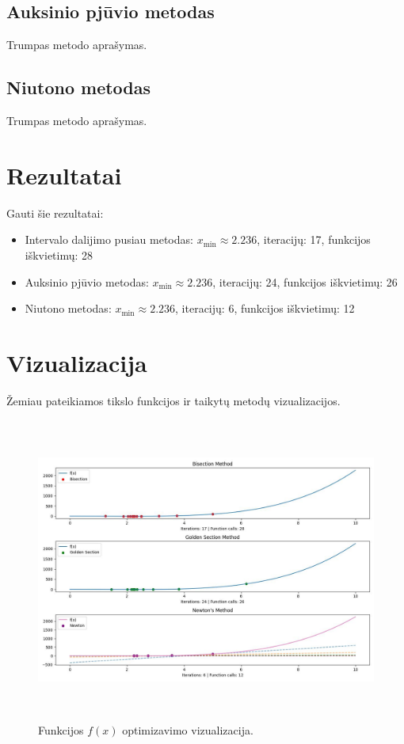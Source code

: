 \documentclass[a4paper,12pt]{article}
\begin{document}
\subsection{Auksinio pjūvio metodas}
Trumpas metodo aprašymas.

\subsection{Niutono metodas}
Trumpas metodo aprašymas.

\section{Rezultatai}
Gauti šie rezultatai:

\begin{itemize}
    \item Intervalo dalijimo pusiau metodas: 
        $x_{\min} \approx 2.236$, iteracijų: 17, funkcijos iškvietimų: 28
    \item Auksinio pjūvio metodas:
        $x_{\min} \approx 2.236$, iteracijų: 24, funkcijos iškvietimų: 26
    \item Niutono metodas:
        $x_{\min} \approx 2.236$, iteracijų: 6, funkcijos iškvietimų: 12
\end{itemize}

\section{Vizualizacija}
Žemiau pateikiamos tikslo funkcijos ir taikytų metodų vizualizacijos.

\begin{figure}[H]
    \centering
    \includegraphics[width=\textwidth,height=10cm]{figure-1.jpeg}
    \caption{\label{fig:all}Funkcijos $f(x)$ optimizavimo vizualizacija.}
\end{figure}
\end{document}
